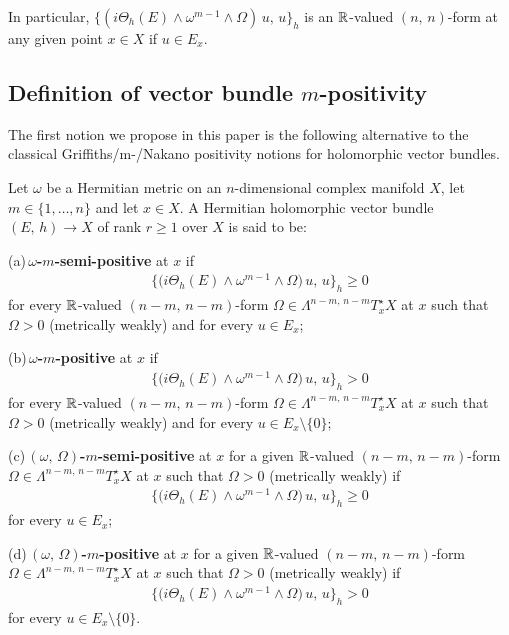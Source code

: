 \documentclass[12pt]{article}
\begin{document}
In particular, $\{(i\Theta_h(E)\wedge\omega^{m-1}\wedge\Omega)\,u,\,u\}_h$ is an $\mathbb{R}$-valued $(n,\,n)$-form at any given point $x\in X$ if $u\in E_x$.


\subsection{Definition of vector bundle $m$-positivity}\label{subsection:m-pos_def}

The first notion we propose in this paper is the following alternative to the classical Griffiths/m-/Nakano positivity notions for holomorphic vector bundles.

\begin{Def}\label{Def:m-pos} Let $\omega$ be a Hermitian metric on an $n$-dimensional complex manifold $X$, let $m\in\{1,\dots , n\}$ and let $x\in X$. A Hermitian holomorphic vector bundle $(E,\,h)\longrightarrow X$ of rank $r\geq 1$ over $X$ is said to be:

\vspace{1ex}

(a)\,{\bf $\omega$-$m$-semi-positive} at $x$ if \begin{eqnarray*}\bigg\{\bigg(i\Theta_h(E)\wedge\omega^{m-1}\wedge\Omega\bigg)\,u,\,u\bigg\}_h\geq 0\end{eqnarray*} for every $\mathbb{R}$-valued $(n-m,\,n-m)$-form $\Omega\in\Lambda^{n-m,\,n-m}T^\star_x X$ at $x$ such that $\Omega> 0$ (metrically weakly) and for every $u\in E_x$; 

\vspace{1ex}

(b)\,{\bf $\omega$-$m$-positive} at $x$ if \begin{eqnarray*}\bigg\{\bigg(i\Theta_h(E)\wedge\omega^{m-1}\wedge\Omega\bigg)\,u,\,u\bigg\}_h> 0\end{eqnarray*} for every $\mathbb{R}$-valued $(n-m,\,n-m)$-form $\Omega\in\Lambda^{n-m,\,n-m}T^\star_x X$ at $x$ such that $\Omega> 0$ (metrically weakly) and for every $u\in E_x\setminus\{0\}$;

\vspace{1ex}

(c)\,{\bf $(\omega,\,\Omega)$-$m$-semi-positive} at $x$ for a given $\mathbb{R}$-valued $(n-m,\,n-m)$-form $\Omega\in\Lambda^{n-m,\,n-m}T^\star_x X$ at $x$ such that $\Omega> 0$ (metrically weakly) if \begin{eqnarray*}\bigg\{\bigg(i\Theta_h(E)\wedge\omega^{m-1}\wedge\Omega\bigg)\,u,\,u\bigg\}_h\geq 0\end{eqnarray*} for every $u\in E_x$;

\vspace{1ex}

(d)\,{\bf $(\omega,\,\Omega)$-$m$-positive} at $x$ for a given $\mathbb{R}$-valued $(n-m,\,n-m)$-form $\Omega\in\Lambda^{n-m,\,n-m}T^\star_x X$ at $x$ such that $\Omega> 0$ (metrically weakly) if \begin{eqnarray*}\bigg\{\bigg(i\Theta_h(E)\wedge\omega^{m-1}\wedge\Omega\bigg)\,u,\,u\bigg\}_h> 0\end{eqnarray*} for every $u\in E_x\setminus\{0\}$.


\end{Def}  
\end{document}
